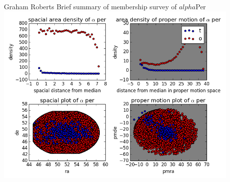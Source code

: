 \documentclass{article}
\begin{document}
Graham Roberts
Brief summary of membership survey of $alpha$Per
\includegraphics[width=0.9\textwidth]{quadplot}
\end{document}
